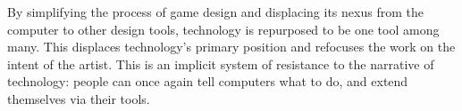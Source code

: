 By simplifying the process of game design and displacing its nexus from the computer to other design tools, technology is repurposed to be one tool among many. This displaces technology's primary position and refocuses the work on the intent of the artist. This is an implicit system of resistance to the narrative of technology: people can once again tell computers what to do, and extend themselves via their tools.

